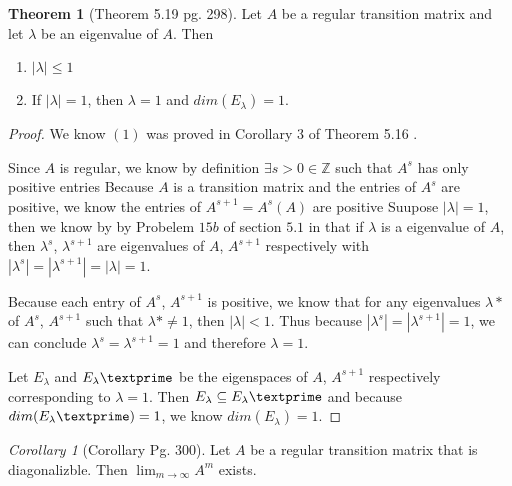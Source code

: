 \documentclass{amsart}
\theoremstyle{definition}
\newtheorem{theorem}{Theorem}
\theoremstyle{remark}
\newtheorem{corollary}{Corollary}[theorem]
\numberwithin{equation}{section}
\begin{document}
\begin{theorem}[Theorem 5.19 pg. 298]
Let $A$ be a regular transition matrix and let $\lambda$ be an eigenvalue of $A$.  Then 

\begin{enumerate}
	\item $|\lambda| \leq 1$
	\item If $|\lambda| = 1$, then $\lambda = 1$ and $dim(E_{\lambda}) = 1$.

\end{enumerate}

\end{theorem}

\begin{proof}

We know $(1)$ was proved in Corollary 3 of Theorem 5.16 \cite{friedberg2003linear}.

Since $A$ is regular, we know by definition $\exists s > 0 \in \mathbb{Z}$ such that $A^s$ has only positive entries
Because $A$ is a transition matrix and the entries of $A^s$ are positive, we know the entries of $A^{s+1} = A^s(A)$ are positive 
Suupose $|\lambda| = 1$, then we know by by Probelem $15b$ of section $5.1$ in \cite{friedberg2003linear} that if $\lambda$ is a eigenvalue of $A$, then $\lambda^s$, $\lambda^{s+1}$ are eigenvalues of $A$, $A^{s+1}$ respectively with $ |\lambda^s |= |\lambda^{s+1} |= |\lambda| = 1$.

Because each entry of $A^s$, $A^{s+1}$ is positive, we know that for any eigenvalues $\lambda*$ of $A^s$, $A^{s+1}$ such that $\lambda* \neq 1$, then $|\lambda| < 1$.
Thus because $|\lambda^s |= |\lambda^{s+1} |= 1 $, we can conclude $\lambda^s = \lambda^{s+1} = 1$ and therefore $\lambda = 1$.

Let $E_{\lambda}$ and $E_{\lambda}\textprime$ be the eigenspaces of $A$, $A^{s+1}$ respectively corresponding to $\lambda = 1$.
Then $E_{\lambda} \subseteq E_{\lambda}\textprime$  and because $dim(E_{\lambda}\textprime) = 1$, we know $dim(E_{\lambda}) = 1$.


\end{proof}


\begin{corollary}[Corollary Pg. 300]
Let $A$ be a regular transition matrix that is diagonalizble.
Then $\lim_{m \to \infty} A^m$ exists.

\end{corollary}
\end{document}
